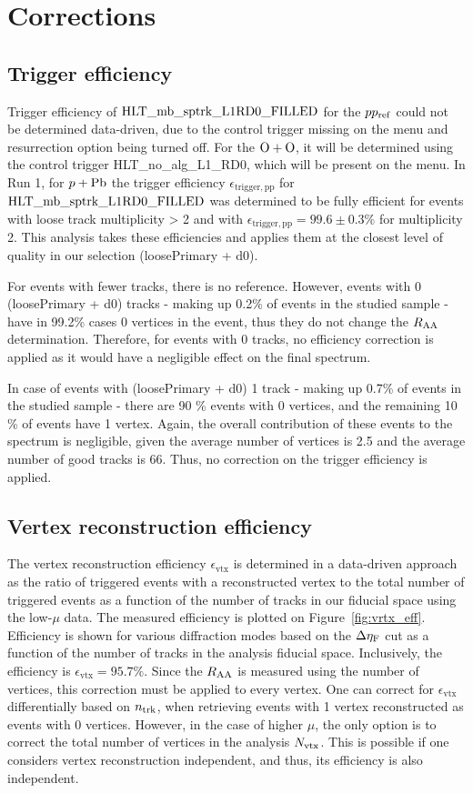\chapter{Corrections}
\label{chap:corr}

\section{Trigger efficiency}
Trigger efficiency of $\text{HLT\_mb\_sptrk\_L1RD0\_FILLED}$ for the $pp_{\mathrm{ref}}$ could not be determined data-driven, due to the control trigger missing on the menu and resurrection option being turned off. For the $\OO$, it will be determined using the control trigger HLT\_no\_alg\_L1\_RD0, which will be present on the menu. In Run 1, for $\pPb$ \cite{ATLAS-CONF-2013-104} the trigger efficiency $\epsilon_{\mathrm{trigger, pp}}$ for $\text{HLT\_mb\_sptrk\_L1RD0\_FILLED}$ was determined to be fully efficient for events with loose track multiplicity > 2 and with $\epsilon_{\mathrm{trigger, pp}} = 99.6\pm0.3\%$ for multiplicity 2. This analysis takes these efficiencies and applies them at the closest level of quality in our selection (loosePrimary + d0).

For events with fewer tracks, there is no reference. However, events with 0 (loosePrimary + d0) tracks - making up 0.2\% of events in the studied sample - have in 99.2\% cases 0 vertices in the event, thus they do not change the $\RAA$ determination. Therefore, for events with 0 tracks, no efficiency correction is applied as it would have a negligible effect on the final spectrum.

In case of events with (loosePrimary + d0) 1 track - making up 0.7\% of events in the studied sample - there are 90 \% events with 0 vertices, and the remaining 10 \% of events have 1 vertex. Again, the overall contribution of these events to the spectrum is negligible, given the average number of vertices is 2.5 and the average number of good tracks is 66. Thus, no correction on the trigger efficiency is applied.

\section{Vertex reconstruction efficiency}
The vertex reconstruction efficiency $\epsilon_{\mathrm{vtx}}$ is determined in a data-driven approach as the ratio of triggered events with a reconstructed vertex to the total number of triggered events as a function of the number of tracks in our fiducial space using the low-$\mu$ data. The measured efficiency is plotted on Figure~\ref{fig:vrtx_eff}. Efficiency is shown for various diffraction modes based on the $\Delta \eta_{\mathrm{F}}$ cut as a function of the number of tracks in the analysis fiducial space. Inclusively, the efficiency is $\epsilon_{\mathrm{vtx}} = 95.7\%$. Since the $\RAA$ is measured using the number of vertices, this correction must be applied to every vertex. One can correct for $\epsilon_{\mathrm{vtx}}$ differentially based on $n_\text{trk}$, when retrieving events with 1 vertex reconstructed as events with 0 vertices. However, in the case of higher $\mu$, the only option is to correct the total number of vertices in the analysis $N_\text{vtx}$. This is possible if one considers vertex reconstruction independent, and thus, its efficiency is also independent. 

